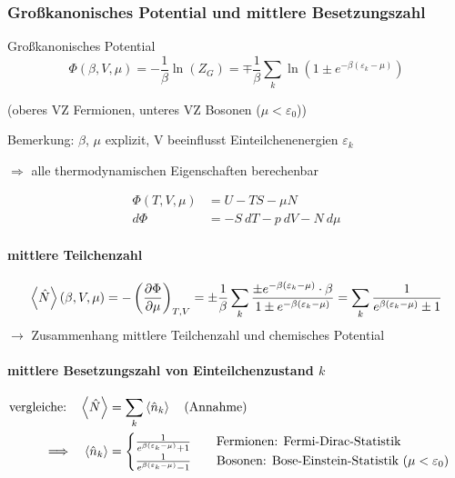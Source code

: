 \subsubsection{Großkanonisches Potential und mittlere Besetzungszahl} 

\begin{definition}{Großkanonisches Potential}
    \begin{equation}
        \Phi(\beta,V,\mu) = - \frac{1}{\beta} \ln(Z_G) = \mp \frac{1}{\beta} \sum_k \ln\left(1 \pm e^{-\beta(\varepsilon_k-\mu)}\right)
    \end{equation}
\end{definition}
\begin{center}
    (oberes VZ Fermionen, unteres VZ Bosonen ($\mu < \varepsilon_0$))
\end{center}
Bemerkung: $\beta$, $\mu$ explizit, V beeinflusst Einteilchenenergien $\varepsilon_k$
\begin{center}
    $\Longrightarrow$ alle thermodynamischen Eigenschaften berechenbar
\end{center}
\begin{align}
    \Phi(T,V,\mu) &= U - TS -\mu N\\
    d\Phi &= - S \ dT - p \ dV - N \ d\mu
\end{align}

\paragraph{mittlere Teilchenzahl}
\begin{equation}
    \expval{\hat{N}}(\beta,V,\mu) = - \left(\pdv{\Phi}{\mu}\right)_{T,V} = \pm \frac{1}{\beta} \sum_k \frac{\pm e^{-\beta(\varepsilon_k-\mu)}\cdot \beta}{1 \pm e^{-\beta(\varepsilon_k-\mu)}} = \sum_k \frac{1}{e^{\beta(\varepsilon_k-\mu)}\pm 1}
\end{equation}
$\rightarrow$ Zusammenhang mittlere Teilchenzahl und chemisches Potential

\paragraph{mittlere Besetzungszahl von Einteilchenzustand $k$}
\begin{align}
    \qq*{vergleiche:} \expval{\hat{N}} &= \sum_k \expval{\hat{n}_k} \qq{(Annahme)} \\
    \Longrightarrow \quad \expval{\hat{n}_k} &=
    \begin{cases}
        \frac{1}{e^{\beta(\varepsilon_k-\mu)}+1} \qquad \text{Fermionen: Fermi-Dirac-Statistik} \\
        \frac{1}{e^{\beta(\varepsilon_k-\mu)}-1} \qquad \text{Bosonen: Bose-Einstein-Statistik } (\mu< \varepsilon_0)
    \end{cases}
\end{align}

